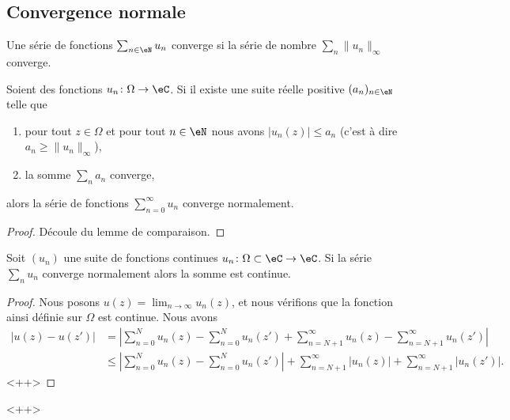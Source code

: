 \subsection{Convergence normale}

Une série de fonctions \( \sum_{n\in \eN}u_n \) converge  si la série de nombre \( \sum_n\| u_n \|_{\infty}\) converge.

\begin{lemma}
    Soient des fonctions \( u_n\colon \Omega\to \eC\). Si il existe une suite réelle positive \( (a_n)_{n\in \eN}\) telle que
    \begin{enumerate}
        \item
            pour tout \( z\in \Omega\) et pour tout \( n\in \eN\) nous avons \( | u_n(z) |\leq a_n\) (c'est à dire \( a_n\geq \| u_n \|_{\infty}\)),
        \item
            la somme \( \sum_{n}a_n\) converge,
    \end{enumerate}
    alors la série de fonctions \( \sum_{n=0}^{\infty}u_n\) converge normalement.
\end{lemma}

\begin{proof}
    Découle du lemme de comparaison.
\end{proof}

\begin{proposition}
    Soit \( (u_n)\) une suite de fonctions continues \( u_n\colon \Omega\subset\eC\to \eC\). Si la série \( \sum_nu_n\) converge normalement alors la somme est continue.
\end{proposition}

\begin{proof}
    Nous posons \( u(z)=\lim_{n\to \infty} u_n(z)\), et nous vérifions que la fonction ainsi définie sur \( \Omega\) est continue. Nous avons
    \begin{subequations}
        \begin{align}
            \big| u(z)-u(z') \big|&=\left| \sum_{n=0}^{N}u_n(z)-\sum_{n=0}^{N}u_n(z')+\sum_{n=N+1}^{\infty}u_n(z)-\sum_{n=N+1}^{\infty}u_n(z') \right| \\
            &\leq \left| \sum_{n=0}^N u_n(z)-\sum_{n=0}^Nu_n(z') \right| +\sum_{n=N+1}^{\infty}| u_n(z) |+\sum_{n=N+1}^{\infty}| u_n(z') |.
        \end{align}
    \end{subequations}
    <++>
\end{proof}
<++>
